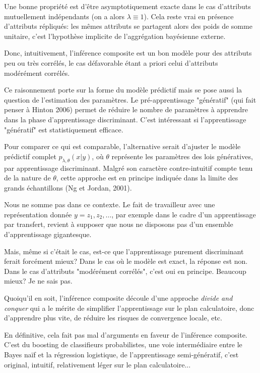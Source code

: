 \documentclass{article}
\begin{document}
Une bonne propri\'et\'e est d'\^etre asymptotiquement exacte dans le cas d'attributs mutuellement ind\'ependants (on a alors $\lambda\equiv 1$). Cela reste vrai en pr\'esence d'attributs r\'epliqu\'es:  les m\^emes attributs se partagent alors des poids de somme unitaire, c'est l'hypoth\`ese implicite de l'aggr\'egation bay\'esienne externe. 

Donc, intuitivement, l'inf\'erence composite est un bon mod\`ele pour des attributs peu ou tr\`es corr\'el\'es, le cas d\'efavorable \'etant a priori celui d'attributs mod\'er\'ement corr\'el\'es.

Ce raisonnement porte sur la forme du mod\`ele pr\'edictif mais se pose aussi la question de l'estimation des param\`etres. Le pr\'e-apprentissage "g\'en\'eratif" (qui fait penser \`a Hinton 2006) permet de r\'eduire le nombre de param\`etres \`a apprendre dans la phase d'apprentissage discriminant. C'est int\'eressant si l'apprentissage "g\'en\'eratif" est statistiquement efficace.

Pour comparer ce qui est comparable, l'alternative serait d'ajuster le mod\`ele pr\'edictif complet $p_{\lambda,\theta}(x|y)$, o\`u $\theta$ repr\'esente les param\`etres des lois g\'en\'eratives, par apprentissage discriminant. Malgr\'e son caract\`ere contre-intuitif compte tenu de la nature de $\theta$, cette approche est en principe indiqu\'ee dans la limite des grands \'echantillons (Ng et Jordan, 2001). 

Nous ne somme pas dans ce contexte. Le fait de travailleur avec une repr\'esentation donn\'ee $y=z_1,z_2,\ldots$, par exemple dans le cadre d'un apprentissage par transfert, revient \`a supposer que nous ne disposons pas d'un ensemble d'apprentissage gigantesque. 

Mais, m\^eme si c'\'etait le cas, est-ce que l'apprentissage purement discriminant ferait forc\'ement mieux? Dans le cas o\`u le mod\`ele est exact, la r\'eponse est non. Dans le cas d'attributs "mod\'er\'ement corr\'el\'es", c'est oui en principe. Beaucoup mieux? Je ne sais pas.

Quoiqu'il en soit, l'inf\'erence composite d\'ecoule d'une approche {\em divide and conquer} qui a le m\'erite de simplifier l'apprentissage sur le plan calculatoire, donc d'apprendre plus vite, de r\'eduire les risques de convergence locale, etc.

En d\'efinitive, cela fait pas mal d'arguments en faveur de l'inf\'erence composite. C'est du boosting de classifieurs probabilistes, une voie interm\'ediaire entre le Bayes na\"if et la r\'egression logistique, de l'apprentissage semi-g\'en\'eratif, c'est original, intuitif, relativement l\'eger sur le plan calculatoire...
\end{document}
